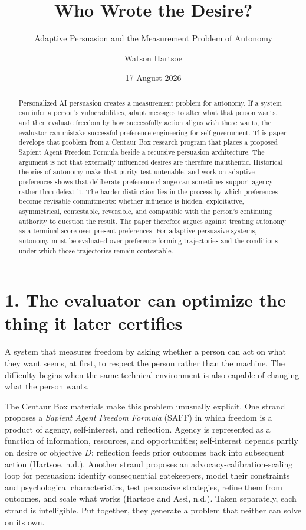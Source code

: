 \documentclass[
  10pt,
]{article}
\title{Who Wrote the Desire?}
\subtitle{Adaptive Persuasion and the Measurement Problem of Autonomy}
\author{Watson Hartsoe}
\date{17 August 2026}
\begin{document}
\maketitle
\begin{abstract}
Personalized AI persuasion creates a measurement problem for autonomy.
If a system can infer a person's vulnerabilities, adapt messages to
alter what that person wants, and then evaluate freedom by how
successfully action aligns with those wants, the evaluator can mistake
successful preference engineering for self-government. This paper
develops that problem from a Centaur Box research program that places a
proposed Sapient Agent Freedom Formula beside a recursive persuasion
architecture. The argument is not that externally influenced desires are
therefore inauthentic. Historical theories of autonomy make that purity
test untenable, and work on adaptive preferences shows that deliberate
preference change can sometimes support agency rather than defeat it.
The harder distinction lies in the process by which preferences become
revisable commitments: whether influence is hidden, exploitative,
asymmetrical, contestable, reversible, and compatible with the person's
continuing authority to question the result. The paper therefore argues
against treating autonomy as a terminal score over present preferences.
For adaptive persuasive systems, autonomy must be evaluated over
preference-forming trajectories and the conditions under which those
trajectories remain contestable.
\end{abstract}

\section{1. The evaluator can optimize the thing it later
certifies}\label{the-evaluator-can-optimize-the-thing-it-later-certifies}

A system that measures freedom by asking whether a person can act on
what they want seems, at first, to respect the person rather than the
machine. The difficulty begins when the same technical environment is
also capable of changing what the person wants.

The Centaur Box materials make this problem unusually explicit. One
strand proposes a \emph{Sapient Agent Freedom Formula} (SAFF) in which
freedom is a product of agency, self-interest, and reflection. Agency is
represented as a function of information, resources, and opportunities;
self-interest depends partly on desire or objective \(D\); reflection
feeds prior outcomes back into subsequent action (Hartsoe, n.d.).
Another strand proposes an advocacy-calibration-scaling loop for
persuasion: identify consequential gatekeepers, model their constraints
and psychological characteristics, test persuasive strategies, refine
them from outcomes, and scale what works (Hartsoe and Assi, n.d.). Taken
separately, each strand is intelligible. Put together, they generate a
problem that neither can solve on its own.
\end{document}
